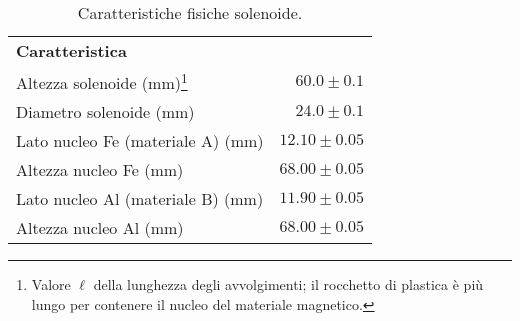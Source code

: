 \squeezetable
\begin{table}[h]
    \begin{ruledtabular}
        \caption{Caratteristiche fisiche solenoide.}
        \label{tab:L_caratt}
        \begin{tabular}{lr}
            \bf{Caratteristica} & \\
            \colrule
            Altezza solenoide (mm)\footnote{Valore $\ell$ della lunghezza degli avvolgimenti; il rocchetto di plastica è più lungo per contenere il nucleo del materiale magnetico.}              
                                                & $60.0  \pm 0.1 $ \\
            Diametro solenoide (mm)             & $24.0  \pm 0.1 $ \\
            Lato nucleo Fe (materiale A) (mm)   & $12.10 \pm 0.05$ \\
            Altezza nucleo Fe (mm)              & $68.00 \pm 0.05$ \\
            Lato nucleo Al (materiale B) (mm)   & $11.90 \pm 0.05$ \\
            Altezza nucleo Al (mm)              & $68.00 \pm 0.05$ \\
        \end{tabular}
    \end{ruledtabular}
\end{table}
